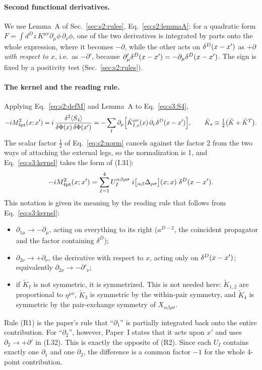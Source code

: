 \documentclass[aps,prd,onecolumn,10pt,nofootinbib,floatfix]{revtex4-2}
\newcommand{\PI}{Paper~I}
\newcommand{\eqI}[1]{(I.#1)}
\begin{document}
\paragraph*{Second functional derivatives.}
We use Lemma~A of Sec.~\ref{sec:s2:rules}, Eq.~\eqref{eq:s2:lemmaA}: for a quadratic form
$F=\int d^Dz\,K^{\mu\nu}\partial_\mu\phi\,\partial_\nu\phi$, one of the two derivatives is integrated by parts
onto the whole expression, where it becomes $-\partial$, while the other acts on $\delta^D(x-x')$ as $+\partial$
\emph{with respect to $x$}, i.e.\ as $-\partial'$, because $\partial'_\mu\delta^D(x-x')=-\partial_\mu\delta^D(x-x')$.
The sign is fixed by a positivity test (Sec.~\ref{sec:s2:rules}).

\paragraph*{The kernel and the reading rule.}
Applying Eq.~\eqref{eq:s2:defM} and Lemma~A to Eq.~\eqref{eq:s3:S4},
\begin{equation}\label{eq:s3:kernel}
-iM^2_{\rm 4pt}(x;x')=i\,\frac{\delta^2\langle S_4\rangle}{\delta\Phi(x)\,\delta\Phi(x')}
=-\sum_I\partial_\mu\Bigl[\tilde K^{\mu\nu}_{I,s}(x)\,\partial_\nu\delta^D(x-x')\Bigr],
\qquad \tilde K_s\equiv\tfrac12\bigl(\tilde K+\tilde K^T\bigr).
\end{equation}
The scalar factor $\frac12$ of Eq.~\eqref{eq:s2:norm} cancels against the factor 2 from the two
ways of attaching the external legs, so the normalization is 1, and Eq.~\eqref{eq:s3:kernel}
takes the form of \eqI{31}:
\begin{equation}\label{eq:s3:I31}
-iM^2_{\rm 4pt}(x;x')=\sum_{I=1}^4U_I^{\alpha\beta\rho\sigma}\;
i\bigl[{}_{\alpha\beta}\Delta_{\rho\sigma}\bigr](x;x)\;\delta^D(x-x') .
\end{equation}
This notation is given its meaning by the reading rule that follows from
Eq.~\eqref{eq:s3:kernel}:
\begin{itemize}
\item[(R1)] $\partial_{1\mu}\to-\partial_\mu$, acting on everything to its right ($a^{D-2}$, the
coincident propagator and the factor containing $\delta^D$);
\item[(R2)] $\partial_{2\nu}\to+\partial_\nu$, the derivative with respect to $x$, acting only on
$\delta^D(x-x')$; equivalently $\partial_{2\nu}\to-\partial'_\nu$;
\item[(R3)] if $\tilde K_I$ is not symmetric, it is symmetrized. This is not needed here:
$\tilde K_{1,2}$ are proportional to $\eta^{\mu\nu}$, $\tilde K_3$ is symmetric by the
within-pair symmetry, and $\tilde K_4$ is symmetric by the pair-exchange symmetry of
$X_{\alpha\beta\rho\sigma}$.
\end{itemize}
Rule (R1) is the paper's rule that ``$\partial_1$'' is partially integrated back onto the
entire contribution. For ``$\partial_2$'', however, \PI{} states that it acts upon $x'$ and
uses $\partial_2\to+\partial'$ in \eqI{32}. This is exactly the opposite of (R2). Since each
$U_I$ contains exactly one $\partial_1$ and one $\partial_2$, the difference is a common factor
$-1$ for the whole 4-point contribution.
\end{document}

